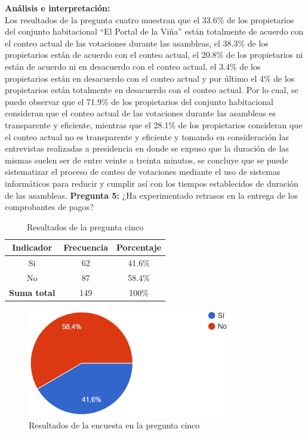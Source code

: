 \textbf{Análisis e interpretación:}\\
Los resultados de la pregunta cuatro muestran que el 33.6\% de los propietarios del conjunto habitacional {\textquotedblleft}El Portal de la Viña{\textquotedblright} están totalmente de acuerdo con el conteo actual de las votaciones durante las asambleas, el 38.3\% de los propietarios están de acuerdo con el conteo actual, el 20.8\% de los propietarios ni están de acuerdo ni en desacuerdo con el conteo actual, el 3.4\% de los propietarios están en desacuerdo con el conteo actual y por último el 4\% de los propietarios están totalmente en desacuerdo con el conteo actual.
Por lo cual, se puede observar que el 71.9\% de los propietarios del conjunto habitacional consideran que el conteo actual de las votaciones durante las asambleas es transparente y eficiente, mientras que el 28.1\% de los propietarios consideran que el conteo actual no es transparente y eficiente y tomando en consideración las entrevistas realizadas a presidencia en donde se expuso que la duración de las mismas suelen ser de entre veinte a treinta minutos, se concluye que se puede sistematizar el proceso de conteo de votaciones mediante el uso de sistemas informáticos para reducir y cumplir así con los tiempos establecidos de duración de las asambleas.
\bigbreak
\textbf{Pregunta 5:} ¿Ha experimentado retrasos en la entrega de los comprobantes de pagos?

\begin{table}[H]
        \centering
        \caption{Resultados de la pregunta cinco}
        \begin{footnotesize}
        \begin{tabular}{|c|c|c|}
            \hline
            \textbf{Indicador} & \textbf{Frecuencia} &  \textbf{Porcentaje} \\
            \hline
            Si & 62 & 41.6\% \\
            \hline
            No & 87 & 58.4\% \\
            \hline
            \textbf{Suma total} & 149 & 100\% \\
            \hline
        \end{tabular}\label{tab:table_preg_5}
        \end{footnotesize}
    \end{table}

    \begin{figure}[H]
        \centering
        \includegraphics[width=0.8\textwidth]{resources/images/p5}
        \caption{Resultados de la encuesta en la pregunta cinco}\label{fig:figure_p5}
    \end{figure}

